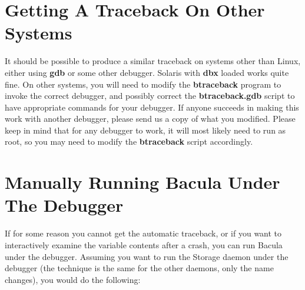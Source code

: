 \section{Getting A Traceback On Other Systems}

It should be possible to produce a similar traceback on systems other than
Linux, either using {\bf gdb} or some other debugger. Solaris with {\bf dbx}
loaded works quite fine. On other systems, you will need to modify the {\bf
btraceback} program to invoke the correct debugger, and possibly correct the
{\bf btraceback.gdb} script to have appropriate commands for your debugger. If
anyone succeeds in making this work with another debugger, please send us a
copy of what you modified. Please keep in mind that for any debugger to
work, it will most likely need to run as root, so you may need to modify
the {\bf btraceback} script accordingly.

\label{ManuallyDebugging}
\section{Manually Running Bacula Under The Debugger}

If for some reason you cannot get the automatic traceback, or if you want to
interactively examine the variable contents after a crash, you can run Bacula
under the debugger. Assuming you want to run the Storage daemon under the
debugger (the technique is the same for the other daemons, only the name
changes), you would do the following: 

